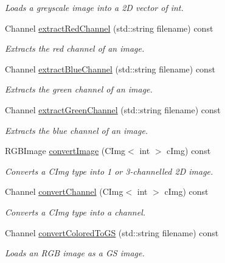 \begin{DoxyCompactItemize}
\begin{DoxyCompactList}\small\item\em Loads a greyscale image into a 2D vector of int. \end{DoxyCompactList}\item 
Channel \hyperlink{class_reader_a4d52dd9aeabc2888b551c9f05c4b6099}{extract\+Red\+Channel} (std\+::string filename) const
\begin{DoxyCompactList}\small\item\em Extracts the red channel of an image. \end{DoxyCompactList}\item 
Channel \hyperlink{class_reader_a46e2de91ea642d5749eaf7c74f0a1381}{extract\+Blue\+Channel} (std\+::string filename) const
\begin{DoxyCompactList}\small\item\em Extracts the green channel of an image. \end{DoxyCompactList}\item 
Channel \hyperlink{class_reader_a8a723ec9b5bebd04143b59e71f68c72a}{extract\+Green\+Channel} (std\+::string filename) const
\begin{DoxyCompactList}\small\item\em Extracts the blue channel of an image. \end{DoxyCompactList}\item 
R\+G\+B\+Image \hyperlink{class_reader_a1dc6b358f453ec604eec390ea7f67cbd}{convert\+Image} (C\+Img$<$ int $>$ c\+Img) const
\begin{DoxyCompactList}\small\item\em Converts a C\+Img type into 1 or 3-\/channelled 2D image. \end{DoxyCompactList}\item 
Channel \hyperlink{class_reader_aaf0f51acf4b34b71e03eb2b11c1b6a16}{convert\+Channel} (C\+Img$<$ int $>$ c\+Img) const
\begin{DoxyCompactList}\small\item\em Converts a C\+Img type into a channel. \end{DoxyCompactList}\item 
Channel \hyperlink{class_reader_a4cb62495bbc5180292a263655243a30a}{convert\+Colored\+To\+GS} (std\+::string filename) const
\begin{DoxyCompactList}\small\item\em Loads an R\+GB image as a GS image. \end{DoxyCompactList}\end{DoxyCompactItemize}


